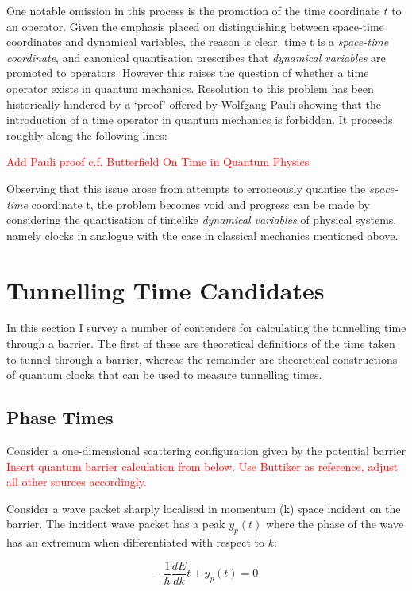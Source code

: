 \documentclass{article}
\begin{document}
One notable omission in this process is the promotion of the time coordinate $t$ to an operator. Given the emphasis placed on distinguishing between space-time coordinates and dynamical variables, the reason is clear: time t is a \textit{space-time coordinate}, and canonical quantisation prescribes that \textit{dynamical variables} are promoted to operators. However this raises the question of whether a time operator exists in quantum mechanics. Resolution to this problem has been historically hindered by a `proof' offered by Wolfgang Pauli showing that the introduction of a time operator in quantum mechanics is forbidden. It proceeds roughly along the following lines:

\textcolor{red}{Add Pauli proof c.f. Butterfield On Time in Quantum Physics}

Observing that this issue arose from attempts to erroneously quantise the \textit{space-time} coordinate t, the problem becomes void and progress can be made by considering the quantisation of timelike \textit{dynamical variables} of physical systems, namely clocks in analogue with the case in classical mechanics mentioned above. 

\section{Tunnelling Time Candidates}

In this section I survey a number of contenders for calculating the tunnelling time through a barrier. The first of these are theoretical definitions of the time taken to tunnel through a barrier, whereas the remainder are theoretical constructions of quantum clocks that can be used to measure tunnelling times.

\subsection{Phase Times}
Consider a one-dimensional scattering configuration given by the potential barrier \textcolor{red}{Insert quantum barrier calculation from below. Use Buttiker as reference, adjust all other sources accordingly.}

Consider a wave packet sharply localised in momentum (k) space incident on the barrier. The incident wave packet has a peak $y_p(t)$ where the phase of the wave has an extremum when differentiated with respect to $k$:

\begin{equation}
	-\frac{1}{\hbar}\frac{dE}{dk}t+y_p(t)=0
	\label{incidentpeak}
\end{equation}
\end{document}
